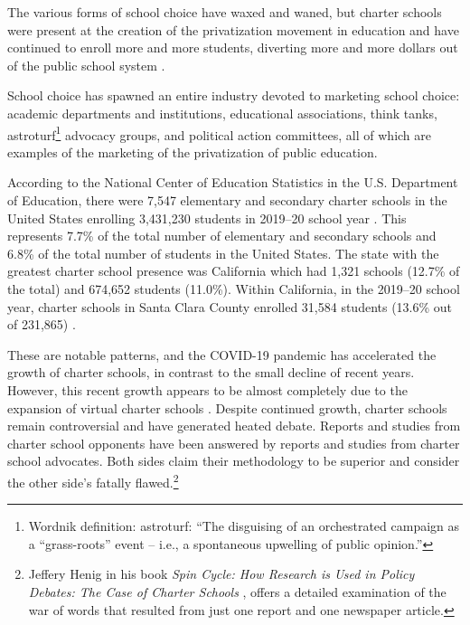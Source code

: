 The various forms of school choice have waxed and waned, but charter schools were present at the creation of the privatization movement in education and have continued to enroll more and more students, diverting more and more dollars out of the public school system \parencites{Lafer2017a}{Lafer2018}{Lafer.etal2021}.
\begin{comment}
  \parencites[131–132]{Lafer2017a}[18]{Lafer2018}[9]{Lafer.etal2021}
\end{comment}
School choice has spawned an entire industry devoted to marketing school choice: academic departments and institutions, educational associations, think tanks, astroturf\footnote{Wordnik definition: astroturf: ``The disguising of an orchestrated campaign as a ``grass-roots'' event – i.e., a spontaneous upwelling of public opinion.''} advocacy groups, and political action committees, all of which are examples of the marketing of the privatization of public education.

According to the National Center of Education Statistics in the U.S. Department of Education, there were 7,547 elementary and secondary charter schools in the United States enrolling 3,431,230 students in 2019–20 school year \parencite[Table 216.90, p.144]{DeBrey.etal2022}. This represents 7.7\% of the total number of elementary and secondary schools and 6.8\% of the total number of students in the United States. The state with the greatest charter school presence was California which had 1,321 schools (12.7\% of the total) and 674,652 students (11.0\%). Within California, in the 2019–20 school year, charter schools in Santa Clara County enrolled 31,584 students (13.6\% out of 231,865) \parencite{CDEDataQuest2021}.

These are notable patterns, and the COVID-19 pandemic has accelerated the growth of charter schools, in contrast to the small decline of recent years. However, this recent growth appears to be almost completely due to the expansion of virtual charter schools \parencite{Strauss2021}. Despite continued growth, charter schools remain controversial and have generated heated debate. Reports and studies from charter school opponents have been answered by reports and studies from charter school advocates. Both sides claim their methodology to be superior and consider the other side's fatally flawed.\footnote{Jeffery Henig in his book \textit{Spin Cycle: How Research is Used in Policy Debates: The Case of Charter Schools} \parencite{Henig2009}, offers a detailed examination of the war of words that resulted from just one report and one newspaper article.}

